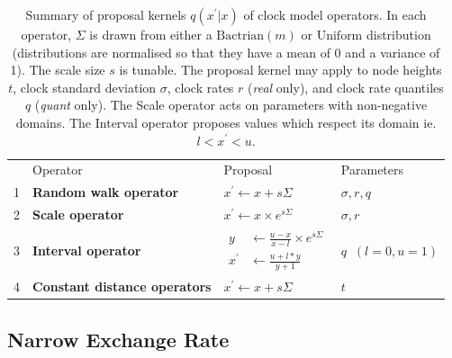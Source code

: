 \documentclass[10pt,letterpaper]{article}
\begin{document}



\begin{table}[h!]
\centering
\begin{tabular}{|l| l l l|} 
 \hline
 & Operator & Proposal & Parameters  \\
 1 & \textbf{Random walk operator} & $x^\prime \leftarrow x + s\Sigma$ & $\sigma, r, q$ \\
 2 & \textbf{Scale operator} & $x^\prime \leftarrow x \times e^{s\Sigma}$ & $\sigma, r$  \\
 3 & \textbf{Interval operator} & $\begin{array} {rl} y &\leftarrow \frac{u - x}{x - l} \times e^{s\Sigma} \\ x^\prime &\leftarrow \frac{u + l * y}{y + 1}  \end{array}$ & $q \;\; (l=0,u=1)$  \\
 4 & \textbf{Constant distance operators} & $x^\prime \leftarrow x + s\Sigma$ & $t$ \\

 \hline
\end{tabular}
\caption{Summary of proposal kernels $q(x^\prime|x)$ of clock model operators. In each operator, $\Sigma$ is drawn from either a $\text{Bactrian}(m)$ or $\text{Uniform}$ distribution (distributions are normalised so that they have a mean of 0 and a variance of 1). The scale size $s$ is tunable. The proposal kernel may apply to node heights $t$, clock standard deviation $\sigma$, clock rates $r$ (\textit{real} only), and clock rate quantiles $q$ (\textit{quant} only). The Scale operator acts on parameters with non-negative domains. The Interval operator proposes values which respect its domain ie. $l < x^\prime < u$. }
\label{table:kernels}
\end{table}




\newpage
\subsection*{Narrow Exchange Rate} \label{sect:NER}
\end{document}
